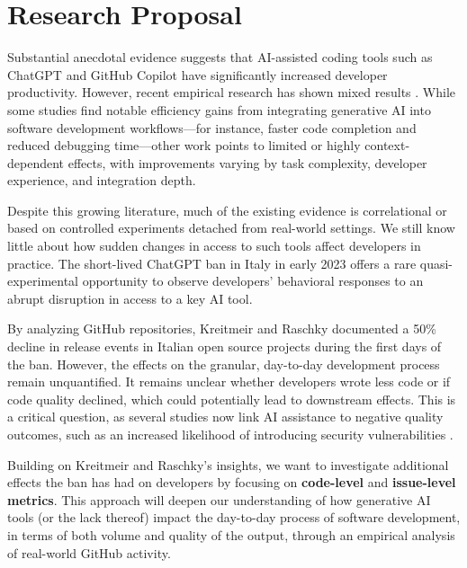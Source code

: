 \section*{Research Proposal}

Substantial anecdotal evidence suggests that AI-assisted coding tools such as ChatGPT \cite{openai_chatgpt} and GitHub Copilot have significantly increased developer productivity. However, recent empirical research has shown mixed results \cite{cui2025the, paradis2024doesaiimpactdevelopment, peng2023impactaideveloperproductivity}. While some studies find notable efficiency gains from integrating generative AI into software development workflows—for instance, faster code completion and reduced debugging time—other work points to limited or highly context-dependent effects, with improvements varying by task complexity, developer experience, and integration depth.

Despite this growing literature, much of the existing evidence is correlational or based on controlled experiments detached from real-world settings. We still know little about how sudden changes in access to such tools affect developers in practice. The short-lived ChatGPT ban in Italy in early 2023 \cite{garante_ban_2023} offers a rare quasi-experimental opportunity to observe developers’ behavioral responses to an abrupt disruption in access to a key AI tool.

By analyzing GitHub repositories, Kreitmeir and Raschky \cite{Kreitmeir2023} documented a 50\% decline in release events in Italian open source projects during the first days of the ban. However, the effects on the granular, day-to-day development process remain unquantified. It remains unclear whether developers wrote less code or if code quality declined, which could potentially lead to downstream effects. This is a critical question, as several studies now link AI assistance to negative quality outcomes, such as an increased likelihood of introducing security vulnerabilities \cite{fu2025securityweaknessescopilotgeneratedcode, pearce2021asleepkeyboardassessingsecurity}.

Building on Kreitmeir and Raschky's insights, we want to investigate additional effects the ban has had on developers by focusing on \textbf{code-level} and \textbf{issue-level metrics}. This approach will deepen our understanding of how generative AI tools (or the lack thereof) impact the day-to-day process of software development, in terms of both volume and quality of the output, through an empirical analysis of real-world GitHub activity.

